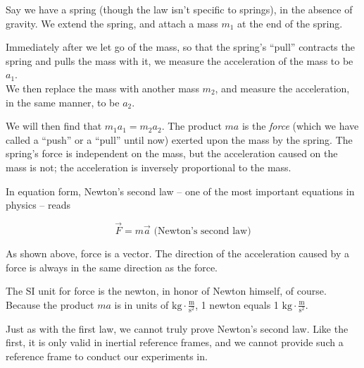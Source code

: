 Say we have a spring (though the law isn't specific to springs), in the absence of gravity. We extend the spring, and attach a mass $m_1$ at the end of the spring.

\begin{figure}[H]
     \centering
{}
\end{figure}

Immediately after we let go of the mass, so that the spring's ``pull'' contracts the spring and pulls the mass with it, we measure the acceleration of the mass to be $a_1$.\\
We then replace the mass with another mass $m_2$, and measure the acceleration, in the same manner, to be $a_2$.

We will then find that $m_1 a_1 = m_2 a_2$. The product $m a$ is the \emph{force} (which we have called a ``push'' or a ``pull'' until now) exerted upon the mass by the spring. The spring's force is independent on the mass, but the acceleration caused on the mass is not; the acceleration is inversely proportional to the mass.

In equation form, Newton's second law -- one of the most important equations in physics -- reads

\begin{equation}
\vec{F} = m \vec{a} \text{ (Newton's second law)} \label{eq:newton2}
\end{equation}

As shown above, force is a vector. The direction of the acceleration caused by a force is always in the same direction as the force.

The SI unit for force is the newton, in honor of Newton himself, of course. Because the product $m a$ is in units of $\displaystyle \text{kg} \cdot \frac{\text{m}}{\text{s}^2}$, 1 newton equals 1 $\displaystyle \text{kg} \cdot \frac{\text{m}}{\text{s}^2}$.

Just as with the first law, we cannot truly prove Newton's second law. Like the first, it is only valid in inertial reference frames, and we cannot provide such a reference frame to conduct our experiments in.


